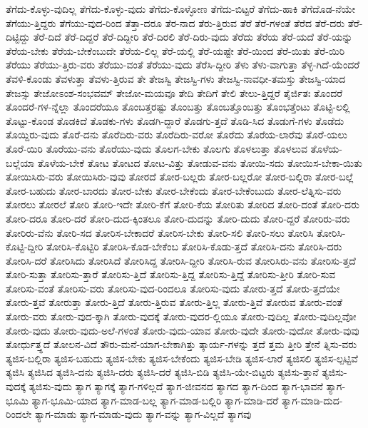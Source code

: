 {ತೆಗೆದು-ಕೊಳ್ಳು-ವುದಿಲ್ಲ
ತೆಗೆದು-ಕೊಳ್ಳು-ವುದು
ತೆಗೆದು-ಕೊಳ್ಳೋಣ
ತೆಗೆದು-ಬಿಟ್ಟರೆ
ತೆಗೆದು-ಹಾಕಿ
ತೆಗೆದೊಡ-ನೆಯೇ
ತೆಗೆಯು-ತ್ತಿದ್ದರು
ತೆಗೆಯು-ವುದ-ರಿಂದ
ತೆತ್ತಾ-ದರೂ
ತೆರ-ನಾದ
ತೆರು-ತ್ತಿರುವ
ತೆರೆ
ತೆರೆ-ಗಳಂತೆ
ತೆರೆದ
ತೆರೆ-ದರು
ತೆರೆ-ದಿಟ್ಟಿದ್ದು
ತೆರೆ-ದಿದೆ
ತೆರೆ-ದಿದ್ದರೆ
ತೆರೆ-ದಿದ್ದೀರಿ
ತೆರೆ-ದಿರಲಿ
ತೆರೆ-ದಿರು-ವುದು
ತೆರೆದು
ತೆರೆಯ
ತೆರೆ-ಯದೆ
ತೆರೆ-ಯನ್ನು
ತೆರೆಯ-ಬೇಕು
ತೆರೆಯ-ಬೇಕೆಂಬುದೇ
ತೆರೆಯ-ಲಿಲ್ಲ
ತೆರೆ-ಯಲ್ಲಿ
ತೆರೆ-ಯಷ್ಟೇ
ತೆರೆ-ಯಿಂದ
ತೆರೆ-ಯಿತು
ತೆರೆ-ಯಿರಿ
ತೆರೆಯು
ತೆರೆಯು-ತ್ತಿರು-ವರು
ತೆರೆಯು-ವಂತೆ
ತೆರೆಯು-ವುದು
ತೆರೆಸಿ-ದ್ದೀರಿ
ತೆಳು
ತೆಳು-ವಾಗುತ್ತಾ
ತೆಳ್ಳ-ಗಿದೆ-ಯೆಂದರೆ
ತೆವಳಿ-ಕೊಂಡು
ತೆವಳುತ್ತಾ
ತೆವಳು-ತ್ತಿರುವ
ತೇ
ತೇಜಸ್ವಿ
ತೇಜಸ್ವಿ-ಗಳು
ತೇಜಸ್ವಿ-ನಾವಧೀ-ತಮಸ್ತು
ತೇಜಸ್ವಿ-ಯಾದ
ತೇಜಸ್ಸು
ತೇಜೋಽಂಶ-ಸಂಭವಮ್
ತೇಜೋ-ಮಯವೂ
ತೇದಿ
ತೇದಿಗೆ
ತೇಲಿ
ತೇಲು-ತ್ತಿದ್ದರೆ
ತೈರ್ಜಿತಃ
ತೊಂದರೆ
ತೊಂದರೆ-ಗಳ-ನ್ನೆಲ್ಲಾ
ತೊಂದರೆಯೂ
ತೊಂಬತ್ತರಷ್ಟು
ತೊಂಬತ್ತು
ತೊಂಬತ್ತೊಂಬತ್ತು
ತೊಂಭತ್ತೆಂಟು
ತೊಟ್ಟಿ-ಲಲ್ಲಿ
ತೊಟ್ಟು-ಕೊಂಡ
ತೊಡಕಿದೆ
ತೊಡಕು-ಗಳು
ತೊಡಗಿ-ದ್ದಾರೆ
ತೊಡಗು-ತ್ತದೆ
ತೊಡಿ-ಸಿದ
ತೊಡುಗೆ-ಗಳು
ತೊಡೆದು
ತೊಯ್ದಿರು-ವುದು
ತೊರೆ-ದನು
ತೊರೆದಿರು-ವರು
ತೊರೆದಿರು-ವರೋ
ತೊರೆದು
ತೊರೆಯ-ಲಾರೆವು
ತೊರೆ-ಯಲು
ತೊರೆ-ಯಿರಿ
ತೊರೆಯು-ವನು
ತೊರೆಯು-ವುದು
ತೊಲಗ-ಬೇಕು
ತೊಲಗು
ತೊಳಲುತ್ತಾ
ತೊಳಲುವ
ತೊಳೆಯ-ಬಲ್ಲೆಯಾ
ತೊಳೆಯ-ಬೇಕೆ
ತೋಟ
ತೋಟದ
ತೋಟ-ವಿತ್ತು
ತೋಡುವ-ವನು
ತೋಯಿ-ಸದು
ತೋಯಿಸ-ಬೇಕಾ-ಯಿತು
ತೋಯಿಸಿರು-ವರು
ತೋಯಿಸಿರು-ವುವು
ತೋರದೆ
ತೋರ-ಬಲ್ಲರು
ತೋರ-ಬಲ್ಲರೋ
ತೋರ-ಬಲ್ಲಿರಾ
ತೋರ-ಬಲ್ಲೆ
ತೋರ-ಬಹುದು
ತೋರ-ಬಾರದು
ತೋರ-ಬೇಕು
ತೋರ-ಬೇಕೆಂದು
ತೋರ-ಬೇಕೆಂಬುದು
ತೋರ-ಲೆತ್ನಿಸು-ವರು
ತೋರಲು
ತೋರಲೆ
ತೋರಿ
ತೋರಿ-ಇದೇ
ತೋರಿ-ಕೆಗೆ
ತೋರಿ-ಕೆಯ
ತೋರಿತು
ತೋರಿದ
ತೋರಿ-ದಂತೆ
ತೋರಿ-ದರು
ತೋರಿ-ದರೂ
ತೋರಿ-ದರೆ
ತೋರಿ-ದುದ-ಕ್ಕಿಂತಲೂ
ತೋರಿ-ದುದನ್ನು
ತೋರಿ-ದುದು
ತೋರಿ-ದ್ದರೆ
ತೋರಿರು-ವರು
ತೋರಿರು-ವೆನು
ತೋರಿ-ಸದ
ತೋರಿಸ-ಬೇಕಾದರೆ
ತೋರಿಸ-ಬೇಕು
ತೋರಿ-ಸಲಿ
ತೋರಿ-ಸಲು
ತೋರಿಸಿ
ತೋರಿಸಿ-ಕೊಟ್ಟಿ-ದ್ದೀರಿ
ತೋರಿಸಿ-ಕೊಟ್ಟಿರಿ
ತೋರಿಸಿ-ಕೊಡ-ಬೇಕೆಂಬ
ತೋರಿಸಿ-ಕೊಡು-ತ್ತದೆ
ತೋರಿಸಿ-ದನು
ತೋರಿಸಿ-ದರು
ತೋರಿಸಿ-ದರೆ
ತೋರಿಸಿದು
ತೋರಿಸಿದೆ
ತೋರಿಸಿದ್ದ
ತೋರಿಸಿ-ದ್ದೀರಿ
ತೋರಿಸಿ-ರುವ
ತೋರಿಸಿರು-ವನು
ತೋರಿಸು-ತ್ತದೆ
ತೋರಿ-ಸುತ್ತಾ
ತೋರಿಸು-ತ್ತಾರೆ
ತೋರಿಸು-ತ್ತಿದೆ
ತೋರಿಸು-ತ್ತಿದ್ದ
ತೋರಿಸು-ತ್ತಿದ್ದೆ
ತೋರಿಸು-ತ್ತೀರಿ
ತೋರಿ-ಸುವ
ತೋರಿಸು-ವಂತೆ
ತೋರಿಸು-ವರು
ತೋರಿಸು-ವುದ-ರಿಂದಲೂ
ತೋರಿಸು-ವುದು
ತೋರು-ತ್ತದೆ
ತೋರು-ತ್ತದೆಯೇ
ತೋರು-ತ್ತವೆ
ತೋರುತ್ತಾ
ತೋರು-ತ್ತಿದೆ
ತೋರು-ತ್ತಿರುವ
ತೋರು-ತ್ತಿಲ್ಲ
ತೋರು-ತ್ತಿವೆ
ತೋರುವ
ತೋರು-ವಂತೆ
ತೋರು-ವರು
ತೋರು-ವುದ-ಕ್ಕಾಗಿ
ತೋರು-ವುದಕ್ಕೆ
ತೋರು-ವುದರ-ಲ್ಲಿಯೂ
ತೋರು-ವುದಿಲ್ಲ
ತೋರು-ವುದಿಲ್ಲವೋ
ತೋರು-ವುದು
ತೋರು-ವುದು-ಅಲೆ-ಗಳಂತೆ
ತೋರು-ವುದು-ಯಾವ
ತೋರು-ವುದೇ
ತೋರು-ವುದೋ
ತೋರು-ವುವು
ತೋರ್ಧುತ್ತ್ಧದೆ
ತೋಲನ-ವಿದೆ
ತೌರು-ಮನೆ-ಯಾಗ-ಬೇಕಾಗಿತ್ತು
ತ್ಕಾರ್ಯ-ಗಳನ್ನು
ತ್ತದೆ
ತ್ತಮ
ತ್ತೀರಿ
ತ್ತೇನೆ
ತ್ನಿಸು-ವರು
ತ್ಯಜಿಸ-ಬಲ್ಲಿರಾ
ತ್ಯಜಿಸ-ಬಹುದು
ತ್ಯಜಿಸ-ಬೇಕು
ತ್ಯಜಿಸ-ಬೇಕೆಂದು
ತ್ಯಜಿಸ-ಬೇಡಿ
ತ್ಯಜಿಸ-ಲಾರೆ
ತ್ಯಜಿಸಲಿ
ತ್ಯಜಿಸ-ಲ್ಪಟ್ಟಿವೆ
ತ್ಯಜಿಸಿ
ತ್ಯಜಿಸಿದ
ತ್ಯಜಿಸಿ-ದನು
ತ್ಯಜಿಸಿ-ದರು
ತ್ಯಜಿಸಿ-ದರೆ
ತ್ಯಜಿಸಿ-ಬಿಡಿ
ತ್ಯಜಿಸಿ-ಯೇ-ಬಿಟ್ಟರು
ತ್ಯಜಿಸು-ತ್ತಾನೆ
ತ್ಯಜಿಸು-ವುದಕ್ಕೆ
ತ್ಯಜಿಸು-ವುದು
ತ್ಯಾಗ
ತ್ಯಾಗಕ್ಕೆ
ತ್ಯಾಗ-ಗಳಿಲ್ಲದೆ
ತ್ಯಾಗ-ಜೀವನದ
ತ್ಯಾಗದ
ತ್ಯಾಗ-ದಿಂದ
ತ್ಯಾಗ-ಭಾವನೆ
ತ್ಯಾಗ-ಭೂಮಿ
ತ್ಯಾಗ-ಭೂಮಿ-ಯಾದ
ತ್ಯಾಗ-ಮಾಡ-ಬಲ್ಲ
ತ್ಯಾಗ-ಮಾಡ-ಬಲ್ಲಿರಿ
ತ್ಯಾಗ-ಮಾಡಿ-ದರೆ
ತ್ಯಾಗ-ಮಾಡಿ-ದುದ-ರಿಂದಲೇ
ತ್ಯಾಗ-ಮಾಡು
ತ್ಯಾಗ-ಮಾಡು-ವುದು
ತ್ಯಾಗ-ವನ್ನು
ತ್ಯಾಗ-ವಿಲ್ಲದೆ
ತ್ಯಾಗವು
}
